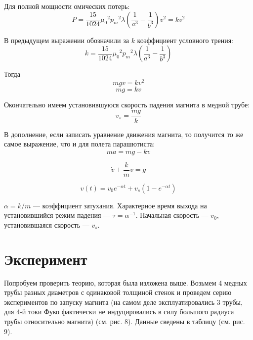 \documentclass[a4paper,12pt]{article} %
\begin{document}
Для полной мощности омических потерь:
$$P = \dfrac{15}{1024} {\mu_0}^2{p_m}^2 \lambda \left(\dfrac{1}{a^3} - \dfrac{1}{b^3}\right)v^2 = kv^2$$

В предыдущем выражении обозначили за $k$ коэффициент условного трения:
$$k = \dfrac{15}{1024} {\mu_0}^2{p_m}^2 \lambda \left(\dfrac{1}{a^3} - \dfrac{1}{b^3}\right)$$

Тогда
$$mgv = kv^2$$
$$mg = kv$$

Окончательно имеем установившуюся скорость падения магнита в медной трубе:
$$v_s = \dfrac{mg}{k}$$

В дополнение, если записать уравнение движения магнита, то получится то же самое выражение, что и для полета парашютиста:
$$ma = mg - kv$$

$$\dot{v} + \dfrac{k}{m} v = g$$

$$v(t) = v_0 e^{-\alpha t} + v_s(1 - e^{-\alpha t})$$

$\alpha = k/m$ — коэффициент затухания. Характерное время выхода на установившийся режим падения — $\tau = \alpha^{-1}$. Начальная скорость — $v_0$, установившаяся скорость — $v_s$.


\section{Эксперимент}

Попробуем проверить теорию, которая была изложена выше. Возьмем 4 медных трубы разных диаметров с одинаковой толщиной стенок и проведем серию экспериментов по запуску магнита (на самом деле эксплуатировались 3 трубы, для 4-й токи Фуко фактически не индуцировались в силу большого радиуса трубы относительно магнита) (см. рис. 8). Данные сведены в таблицу (см. рис. 9).
\end{document}
